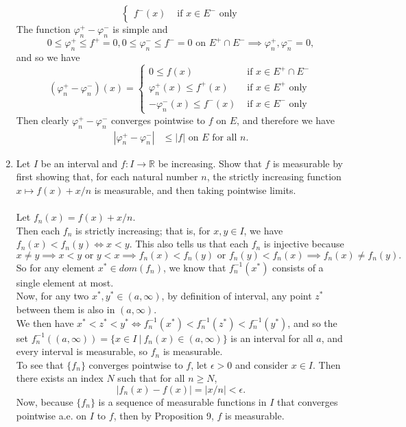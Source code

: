 \begin{enumerate}
\[\begin{cases}
            f^-(x)&\text{ if }x\in E^-\text{ only}
        \end{cases}    
    \]
    The function $\varphi^+_n-\varphi^-_n$ is simple and
    \[
        0\le\varphi^+_n\le f^+=0, 0\le\varphi^-_n\le f^-=0\text{ on }E^+\cap E^-\implies\varphi^+_n,\varphi^-_n =0,
    \]
    and so we have
    \[
        (\varphi^+_n-\varphi^-_n)(x)=
        \begin{cases}
            0\le f(x)&\text{ if }x\in E^+\cap E^-\\
            \varphi^+_n(x)\le f^+(x)&\text{ if }x\in E^+\text{ only}\\
            -\varphi^-_n(x)\le f^-(x)&\text{ if }x\in E^-\text{ only}
        \end{cases}    
    \]
    Then clearly $\varphi^+_n-\varphi^-_n$ converges pointwise to $f$ on $E$, and therefore we have
    \begin{align*}
        |\varphi^+_n-\varphi^-_n|&\le|f|\text{ on }E\text{ for all }n.
    \end{align*}
    \item Let $I$ be an interval and $f:I\to\mathbb{R}$ be increasing. Show that $f$ is measurable by first showing that, for each natural number $n$, the strictly increasing function $x\mapsto f(x)+x/n$ is measurable, and then taking pointwise limits.\\
    \\Let $f_n(x)=f(x)+x/n$.\\
    Then each $f_n$ is strictly increasing; that is, for $x,y\in I$, we have $f_n(x)<f_n(y)\iff x<y$. 
    This also tells us that each $f_n$ is injective because 
    \[
        x\neq y \implies x<y\text{ or }y<x \implies f_n(x)<f_n(y)\text{ or }f_n(y)<f_n(x)\implies f_n(x)\neq f_n(y).
    \]
    So for any element $x^*\in dom(f_n)$, we know that $f_n^{-1}(x^*)$ consists of a single element at most.
    \\Now, for any two $x^*,y^*\in(a,\infty)$, by definition of interval, any point $z^*$ between them is also in $(a,\infty)$. 
    \\We then have $x^*<z^*<y^* \iff f_n^{-1}(x^*)<f_n^{-1}(z^*)<f_n^{-1}(y^*)$, and so the set $f_n^{-1}((a,\infty))=\{x\in I\ |\ f_n(x)\in(a,\infty)\}$ is an interval for all $a$, and every interval is measurable, so $f_n$ is measurable.
    \\To see that $\{f_n\}$ converges pointwise to $f$, let $\epsilon>0$ and consider $x\in I$. 
    Then there exists an index $N$ such that for all $n\ge N$, 
    \[
        |f_n(x)-f(x)|=|x/n|<\epsilon.    
    \]
    Now, because $\{f_n\}$ is a sequence of measurable functions in $I$ that converges pointwise a.e. on $I$ to $f$, then by Proposition 9, $f$ is measurable.
\end{enumerate}

